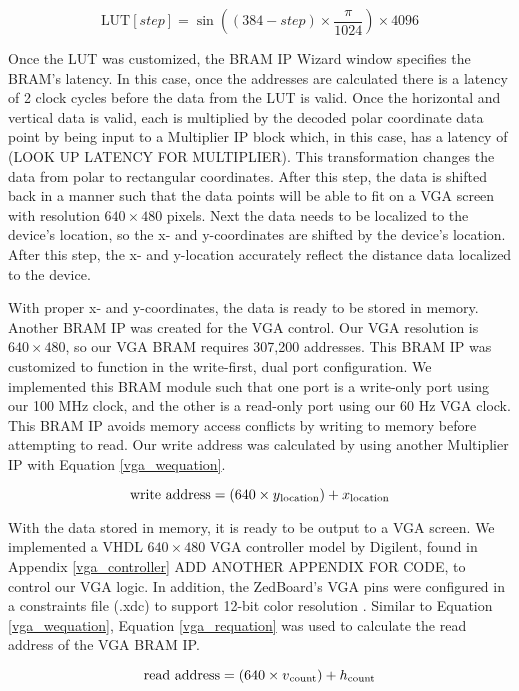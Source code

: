 \begin{equation}
	\textrm{LUT}[step] = \sin((384-step)\times\dfrac{\pi}{1024})\times4096
	\label{coe}
\end{equation}

Once the LUT was customized, the BRAM IP Wizard window specifies the BRAM's latency. In this case, once the addresses are calculated there is a latency of 2 clock cycles before the data from the LUT is valid. Once the horizontal and vertical data is valid, each is multiplied by the decoded polar coordinate data point by being input to a Multiplier IP block which, in this case, has a latency of (LOOK UP LATENCY FOR MULTIPLIER). This transformation changes the data from polar to rectangular coordinates. After this step, the data is shifted back in a manner such that the data points will be able to fit on a VGA screen with resolution $640\times480$ pixels. Next the data needs to be localized to the device's location, so the x- and y-coordinates are shifted by the device's location. After this step, the x- and y-location accurately reflect the distance data localized to the device.
\par
With proper x- and y-coordinates, the data is ready to be stored in memory. Another BRAM IP was created for the VGA control. Our VGA resolution is $640\times480$, so our VGA BRAM requires 307,200 addresses. This BRAM IP was customized to function in the write-first, dual port configuration. We implemented this BRAM module such that one port is a write-only port using our 100 MHz clock, and the other is a read-only port using our 60 Hz VGA clock. This BRAM IP avoids memory access conflicts by writing to memory before attempting to read. Our write address was calculated by using another Multiplier IP with Equation \ref{vga_wequation}.

\begin{equation}
	\textrm{write address} = (640\times{}y\textsubscript{location})+ x\textsubscript{location}
	\label{vga_wequation}
\end{equation}

\par
With the data stored in memory, it is ready to be output to a VGA screen. We implemented a VHDL $640\times480$ VGA controller model by Digilent, found in Appendix \ref{vga_controller} ADD ANOTHER APPENDIX FOR CODE, to control our VGA logic. In addition, the ZedBoard's VGA pins were configured in a constraints file (.xdc) to support 12-bit color resolution \cite{zedboard_datasheet}. Similar to Equation \ref{vga_wequation}, Equation \ref{vga_requation} was used to calculate the read address of the VGA BRAM IP.

\begin{equation}
	\textrm{read address} = (640\times{}v\textsubscript{count})+ h\textsubscript{count}
	\label{vga_requation}
\end{equation}


